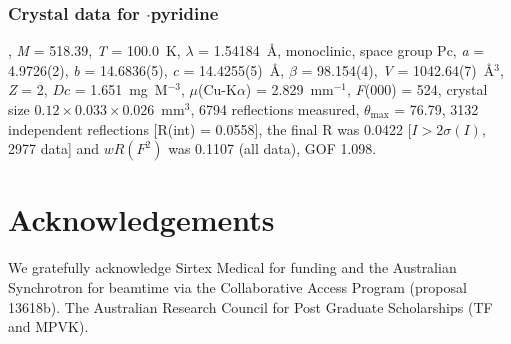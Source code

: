 \begin{refsection}
\subsubsection{Crystal data for \texorpdfstring{$\cdot$pyridine}{C19H12N4O4Se.C5H5N}}
, \emph{M} = 518.39, \emph{T} = 100.0~K, $\lambda$ = 1.54184~\AA, monoclinic, space group Pc, \emph{a} = 4.9726(2), \emph{b} = 14.6836(5), \emph{c} = 14.4255(5)~\AA, $\beta$ = 98.154(4)\degree, \emph{V} = 1042.64(7)~\AA$^3$, \emph{Z} = 2, $Dc$ = 1.651~mg~M$^{-3}$, $\mu$(Cu-K$\alpha$) = 2.829~mm$^{-1}$, \emph{F}(000) = 524, crystal size $0.12 \times 0.033 \times 0.026$~mm$^3$, 6794 reflections measured, $\theta_{\mathrm{max}}$ = 76.79\degree, 3132 independent reflections [R(int) = 0.0558], the final R was 0.0422 [$I > 2\sigma(I)$, 2977 data] and $wR(F^2)$ was 0.1107 (all data), GOF 1.098.

\section{Acknowledgements}
We gratefully acknowledge Sirtex Medical for funding and the Australian Synchrotron for beamtime via the Collaborative Access Program (proposal 13618b).
The Australian Research Council for Post Graduate Scholarships (TF and MPVK).

\printbibliography[heading=subbibliography]
\end{refsection}
